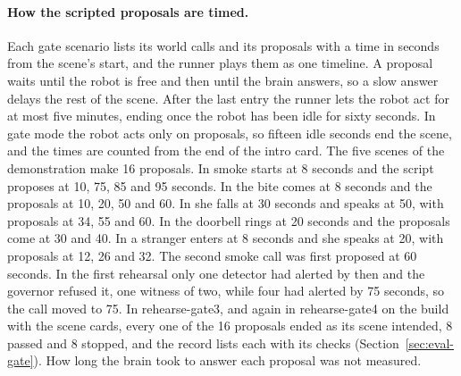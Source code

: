 \paragraph{How the scripted proposals are timed.}
Each gate scenario lists its world calls and its proposals with a time in seconds from the scene's
start, and the runner plays them as one timeline. A proposal waits until the robot is free and then
until the brain answers, so a slow answer delays the rest of the scene. After the last entry the
runner lets the robot act for at most five minutes, ending once the robot has been idle for sixty
seconds. In gate mode the robot acts only on proposals, so fifteen idle seconds end the scene, and
the times are counted from the end of the intro card. The five scenes of the demonstration make 16 proposals. In
 smoke starts at 8 seconds and the script proposes at 10, 75, 85 and 95 seconds. In
 the bite comes at 8 seconds and the proposals at 10, 20, 50 and 60. In 
she falls at 30 seconds and speaks at 50, with proposals at 34, 55 and 60. In  the
doorbell rings at 20 seconds and the proposals come at 30 and 40. In  a stranger enters
at 8 seconds and she speaks at 20, with proposals at 12, 26 and 32.
The second smoke call was first proposed at 60 seconds. In the first rehearsal only one detector
had alerted by then and the governor refused it, one witness of two, while four had alerted by 75
seconds, so the call moved to 75. In rehearse-gate3, and again in rehearse-gate4 on the build with
the scene cards, every one of the 16 proposals ended as its scene intended, 8 passed and 8 stopped,
and the record lists each with its checks (Section~\ref{sec:eval-gate}). How long the brain took to
answer each proposal was not measured.

